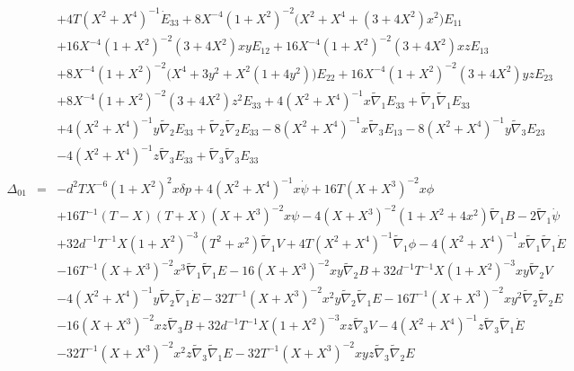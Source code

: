 \documentclass[10pt,letterpaper]{article}
\numberwithin{equation}{section}
\begin{document}
\begin{appendices}
\begin{eqnarray}
&& + 4 T (X^2 + X^4)^{-1} \dot{E}_{33} + 8 X^{-4} (1 + X^2)^{-2} \bigl(X^2 + X^4 + (3 + 4 X^2) x^2\bigr) E_{11} \nonumber \\ 
&& + 16 X^{-4} (1 + X^2)^{-2} (3 + 4 X^2) x y E_{12} + 16 X^{-4} (1 + X^2)^{-2} (3 + 4 X^2) x z E_{13} \nonumber \\ 
&& + 8 X^{-4} (1 + X^2)^{-2} \bigl(X^4 + 3 y^2 + X^2 (1 + 4 y^2)\bigr) E_{22} + 16 X^{-4} (1 + X^2)^{-2} (3 + 4 X^2) y z E_{23} \nonumber \\ 
&& + 8 X^{-4} (1 + X^2)^{-2} (3 + 4 X^2) z^2 E_{33} + 4 (X^2 + X^4)^{-1} x \tilde{\nabla}_{1}E_{33} + \tilde{\nabla}_{1}\tilde{\nabla}_{1}E_{33} \nonumber \\ 
&& + 4 (X^2 + X^4)^{-1} y \tilde{\nabla}_{2}E_{33} + \tilde{\nabla}_{2}\tilde{\nabla}_{2}E_{33} - 8 (X^2 + X^4)^{-1} x \tilde{\nabla}_{3}E_{13} - 8 (X^2 + X^4)^{-1} y \tilde{\nabla}_{3}E_{23} \nonumber \\ 
&& - 4 (X^2 + X^4)^{-1} z \tilde{\nabla}_{3}E_{33} + \tilde{\nabla}_{3}\tilde{\nabla}_{3}E_{33}
\\  \nonumber\\ 
\Delta_{01}&=& - d^2 T X^{-6} (1 + X^2)^2 x \delta p + 4 (X^2 + X^4)^{-1} x \dot{\psi} + 16 T (X + X^3)^{-2} x \phi \nonumber \\ 
&& + 16 T^{-1} (T -  X) (T + X) (X + X^3)^{-2} x \psi - 4 (X + X^3)^{-2} (1 + X^2 + 4 x^2) \tilde{\nabla}_{1}B - 2 \tilde{\nabla}_{1}\dot{\psi} \nonumber \\ 
&& + 32 d^{-1} T^{-1} X (1 + X^2)^{-3} (T^2 + x^2) \tilde{\nabla}_{1}V + 4 T (X^2 + X^4)^{-1} \tilde{\nabla}_{1}\phi - 4 (X^2 + X^4)^{-1} x \tilde{\nabla}_{1}\tilde{\nabla}_{1}\dot{E} \nonumber \\ 
&& - 16 T^{-1} (X + X^3)^{-2} x^3 \tilde{\nabla}_{1}\tilde{\nabla}_{1}E - 16 (X + X^3)^{-2} x y \tilde{\nabla}_{2}B + 32 d^{-1} T^{-1} X (1 + X^2)^{-3} x y \tilde{\nabla}_{2}V \nonumber \\ 
&& - 4 (X^2 + X^4)^{-1} y \tilde{\nabla}_{2}\tilde{\nabla}_{1}\dot{E} - 32 T^{-1} (X + X^3)^{-2} x^2 y \tilde{\nabla}_{2}\tilde{\nabla}_{1}E - 16 T^{-1} (X + X^3)^{-2} x y^2 \tilde{\nabla}_{2}\tilde{\nabla}_{2}E \nonumber \\ 
&& - 16 (X + X^3)^{-2} x z \tilde{\nabla}_{3}B + 32 d^{-1} T^{-1} X (1 + X^2)^{-3} x z \tilde{\nabla}_{3}V - 4 (X^2 + X^4)^{-1} z \tilde{\nabla}_{3}\tilde{\nabla}_{1}\dot{E} \nonumber \\ 
&& - 32 T^{-1} (X + X^3)^{-2} x^2 z \tilde{\nabla}_{3}\tilde{\nabla}_{1}E - 32 T^{-1} (X + X^3)^{-2} x y z \tilde{\nabla}_{3}\tilde{\nabla}_{2}E \nonumber \\ 

\end{eqnarray}
\end{appendices}
\end{document}
